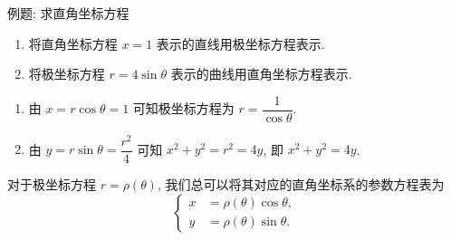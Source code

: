 \begin{frame}{例题: 求直角坐标方程}
	\onslide<+->
	\begin{example}
		\begin{enumerate}
			\item 将直角坐标方程 $x=1$ 表示的直线用极坐标方程表示.
			\item 将极坐标方程 $r=4\sin\theta$ 表示的曲线用直角坐标方程表示.
		\end{enumerate}
	\end{example}
	\onslide<+->
	\begin{solution}
		\begin{enumerate}
			\item 由 $x=r\cos\theta=1$ 可知极坐标方程为 $r=\dfrac1{\cos\theta}$.
			\item 由 $y=r\sin\theta=\dfrac{r^2}4$ 可知 $x^2+y^2=r^2=4y$, 即 $x^2+y^2=4y$.
		\end{enumerate}
	\end{solution}
	\onslide<+->
	对于极坐标方程 $r=\rho(\theta)$, 我们总可以将其对应的直角坐标系的参数方程表为
	\[\left\{\begin{aligned}
		x&=\rho(\theta)\cos\theta,\\
		y&=\rho(\theta)\sin\theta.
	\end{aligned}\right.\]
\end{frame}

